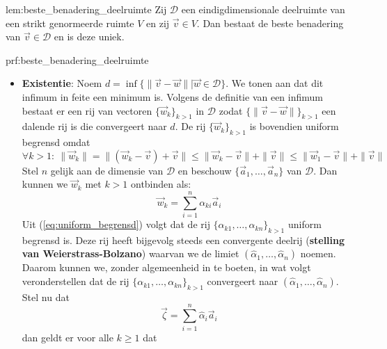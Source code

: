 \begin{lem}{lem:beste_benadering_deelruimte}
    Zij $\mathcal{D}$ een eindigdimensionale deelruimte van een strikt genormeerde ruimte $V$ en zij $\vec{v} \in V$. Dan bestaat de beste benadering van $\vec{v} \in \mathcal{D}$ en is deze uniek.  
\end{lem}

\begin{prf}{prf:beste_benadering_deelruimte}
    \begin{itemize}
        \item 
            \textbf{Existentie}: Noem $d = \inf\{\|\vec{v}-\vec{w}\| | \vec{w} \in \mathcal{D}\}$. We tonen aan dat dit infimum in feite een minimum is. Volgens de definitie van een infimum bestaat er een rij van vectoren $\{\vec{w}_k\}_{k>1}$ in $\mathcal{D}$ zodat $\{\|\vec{v}-\vec{w}\|\}_{k>1}$ een dalende rij is die convergeert naar $d$. De rij $\{\vec{w}_k\}_{k>1}$ is bovendien uniform begrensd omdat 
            \begin{equation}
                \forall k > 1: \ \|\vec{w}_k\| = \|(\vec{w}_k - \vec{v}) + \vec{v}\| \leq \|\vec{w}_k - \vec{v}\| + \|\vec{v}\| \leq \|\vec{w}_1 - \vec{v}\| + \|\vec{v}\|
                \label{eq:uniform_begrensd}
            \end{equation}
            Stel $n$ gelijk aan de dimensie van $\mathcal{D}$ en beschouw $\{\vec{a}_1,\ldots,\vec{a}_n\}$ van $\mathcal{D}$. Dan kunnen we $\vec{w}_k$ met $k > 1$ ontbinden als:
            \begin{equation*}
                \vec{w}_k = \sum_{i=1}^n \alpha_{ki}\vec{a}_i 
            \end{equation*}
            Uit (\ref{eq:uniform_begrensd}) volgt dat de rij $\{\alpha_{k1},\ldots,\alpha_{kn}\}_{k>1}$ uniform begrensd is. Deze rij heeft bijgevolg steeds een convergente deelrij (\textbf{stelling van Weierstrass-Bolzano}) waarvan we de limiet $(\hat{\alpha}_1,\ldots,\hat{\alpha}_n)$ noemen. Daarom kunnen we, zonder algemeenheid in te boeten, in wat volgt veronderstellen dat de rij $\{\alpha_{k1},\ldots,\alpha_{kn}\}_{k>1}$ convergeert naar $(\hat{\alpha}_1,\ldots,\hat{\alpha}_n)$. Stel nu dat
            \begin{equation*}
                \vec{\zeta} = \sum_{i=1}^{n} \hat{\alpha}_i \vec{a}_i
            \end{equation*} 
            dan geldt er voor alle $k\geq1$ dat 
            \begin{equation*}

\end{equation*}
\end{itemize}
\end{prf}
